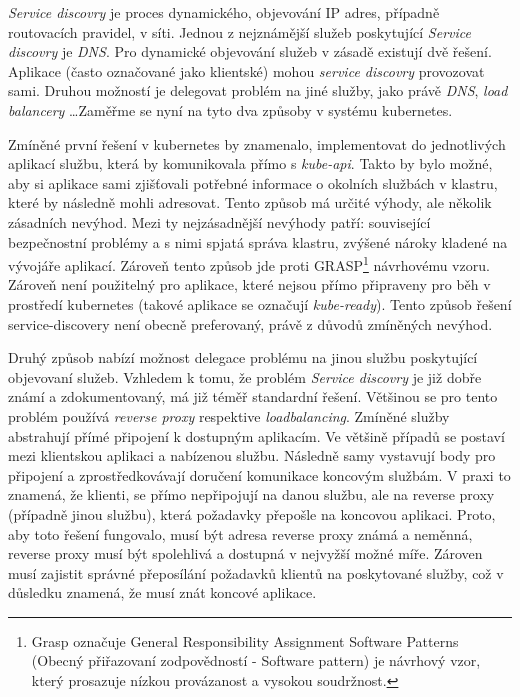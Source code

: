 \textit{Service discovry} je proces dynamického, objevování IP adres, případně routovacích pravidel, v síti. Jednou z nejznámější služeb poskytující \textit{Service discovry} je \textit{DNS}. Pro dynamické objevování služeb v zásadě existují dvě řešení. Aplikace (často označované jako klientské) mohou \textit{service discovry} provozovat sami. Druhou možností je delegovat problém na jiné služby, jako právě \textit{DNS}, \textit{load balancery} \ldots Zaměřme se nyní na tyto dva způsoby v systému kubernetes. 

Zmíněné první řešení v kubernetes by znamenalo, implementovat do jednotlivých aplikací službu, která by komunikovala přímo s \textit{kube-api}. Takto by bylo možné, aby si aplikace sami zjišťovali potřebné informace o okolních službách v klastru, které by následně mohli adresovat. Tento způsob má určité výhody, ale několik zásadních nevýhod. Mezi ty nejzásadnější nevýhody patří: související bezpečnostní problémy a s nimi spjatá správa klastru, zvýšené nároky kladené na vývojáře aplikací. Zároveň tento způsob jde proti GRASP\footnote{Grasp označuje General Responsibility Assignment Software Patterns (Obecný přiřazovaní zodpovědností - Software pattern) je návrhový vzor, který prosazuje nízkou provázanost a vysokou soudržnost.}\cite{bisi1} návrhovému vzoru. Zároveň není použitelný pro aplikace, které nejsou přímo připraveny pro běh v prostředí kubernetes (takové aplikace se označují \textit{kube-ready}). Tento způsob řešení service-discovery není obecně preferovaný, právě z důvodů zmíněných nevýhod.

Druhý způsob nabízí možnost delegace problému na jinou službu poskytující objevovaní služeb. Vzhledem k tomu, že problém \textit{Service discovry} je již dobře známí a zdokumentovaný, má již téměř standardní řešení. Většinou se pro tento problém  používá \textit{reverse proxy} respektive \textit{loadbalancing}. Zmíněné služby abstrahují přímé připojení k dostupným aplikacím. Ve většině případů se postaví mezi klientskou aplikaci a nabízenou službu. Následně samy vystavují body pro připojení a zprostředkovávají doručení komunikace koncovým službám. V praxi to znamená, že klienti, se přímo nepřipojují na danou službu, ale na reverse proxy (případně jinou službu), která požadavky přepošle na koncovou aplikaci. Proto, aby toto řešení fungovalo, musí být adresa reverse proxy známá a neměnná, reverse proxy musí být spolehlivá a dostupná v nejvyžší možné míře. Zároven musí zajistit správné přeposílání požadavků klientů na poskytované služby, což v důsledku znamená, že musí znát koncové aplikace.

